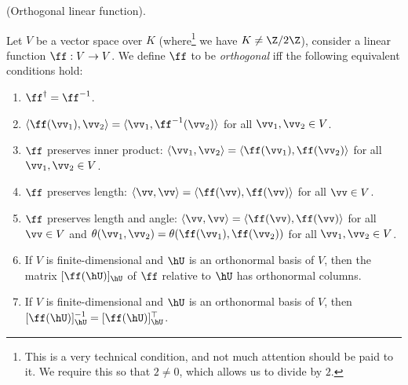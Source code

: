 \begin{defn}
\label{ch::bilinear_forms_metric_tensors::defn::orthogonal_linear_fn}
    (Orthogonal linear function). 
    
    Let $V$ be a vector space over $K$ (where\footnote{This is a very technical condition, and not much attention should be paid to it. We require this so that $2 \neq 0$, which allows us to divide by $2$.} we have $K \neq \Z/2\Z$), consider a linear function $\ff:V \rightarrow V$. We define $\ff$ to be \textit{orthogonal} iff the following equivalent conditions hold:
    
    \begin{enumerate}
        \item $\ff^\dag = \ff^{-1}$.
        \item $\langle \ff(\vv_1), \vv_2 \rangle = \langle \vv_1, \ff^{-1}(\vv_2) \rangle$ for all $\vv_1, \vv_2 \in V$.
        \item $\ff$ preserves inner product: $\langle \vv_1, \vv_2 \rangle = \langle \ff(\vv_1), \ff(\vv_2) \rangle$ for all $\vv_1, \vv_2 \in V$.
        \item $\ff$ preserves length: $\langle \vv, \vv \rangle = \langle \ff(\vv), \ff(\vv) \rangle$ for all $\vv \in V$.
        \item $\ff$ preserves length and angle: $\langle \vv, \vv \rangle = \langle \ff(\vv), \ff(\vv) \rangle$ for all $\vv \in V$ and $\theta(\vv_1, \vv_2) = \theta(\ff(\vv_1), \ff(\vv_2))$ for all $\vv_1, \vv_2 \in V$.
        \item If $V$ is finite-dimensional and $\hU$ is an orthonormal basis of $V$, then the matrix $[\ff(\hU)]_{\hU}$ of $\ff$ relative to $\hU$ has orthonormal columns.
        \item If $V$ is finite-dimensional and $\hU$ is an orthonormal basis of $V$, then $[\ff(\hU)]_{\hU}^{-1} = [\ff(\hU)]_{\hU}^{\top}$.
    \end{enumerate}
\end{defn}
        
